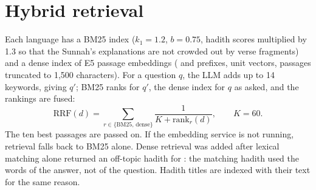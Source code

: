 \section{Hybrid retrieval}
Each language has a BM25 index ($k_1=1.2$, $b=0.75$, hadith scores multiplied by 1.3 so that the Sunnah's explanations
are not crowded out by verse fragments) and a dense index of E5 passage embeddings ( and 
prefixes, unit vectors, passages truncated to 1,500 characters). For a question $q$, the LLM adds up to 14 keywords,
giving $q'$; BM25 ranks for $q'$, the dense index for $q$ as asked, and the rankings are fused:
\begin{equation}
\mathrm{RRF}(d) = \sum_{r \in \{\mathrm{BM25},\,\mathrm{dense}\}} \frac{1}{K + \mathrm{rank}_r(d)}, \qquad K = 60.
\end{equation}
The ten best passages are passed on. If the embedding service is not running, retrieval
falls back to BM25 alone. Dense retrieval was added after lexical matching alone returned an off-topic hadith
for : the matching hadith used the words of the answer, not of the question. Hadith titles are indexed
with their text for the same reason.


